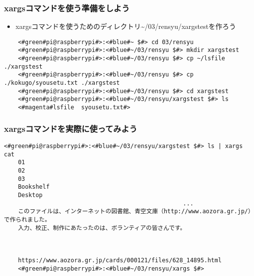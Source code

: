 \begin{frame}[fragile]
    \frametitle{xargsコマンドを使う準備をしよう}
    \begin{itemize}
        \item xargsコマンドを使うためのディレクトリ\textasciitilde/03/rensyu/xargstestを作ろう
    \end{itemize}
    \begin{lstlisting}
    <#green#pi@raspberrypi#>:<#blue#~ $#> cd 03/rensyu
    <#green#pi@raspberrypi#>:<#blue#~/03/rensyu $#> mkdir xargstest
    <#green#pi@raspberrypi#>:<#blue#~/03/rensyu $#> cp ~/lsfile ./xargstest
    <#green#pi@raspberrypi#>:<#blue#~/03/rensyu $#> cp ./kokugo/syousetu.txt ./xargstest
    <#green#pi@raspberrypi#>:<#blue#~/03/rensyu $#> cd xargstest
    <#green#pi@raspberrypi#>:<#blue#~/03/rensyu/xargstest $#> ls
    <#magenta#lsfile  syousetu.txt#>
    \end{lstlisting}
\end{frame}

\begin{frame}[fragile]
    \frametitle{xargsコマンドを実際に使ってみよう}
    \begin{lstlisting}[title=xargsコマンドを使ってcatコマンドを使う]
    <#green#pi@raspberrypi#>:<#blue#~/03/rensyu/xargstest $#> ls | xargs cat
    01
    02
    03
    Bookshelf
    Desktop
                                                   ...
    このファイルは、インターネットの図書館、青空文庫（http://www.aozora.gr.jp/）で作られました。
    入力、校正、制作にあたったのは、ボランティアの皆さんです。
        
        
        
    https://www.aozora.gr.jp/cards/000121/files/628_14895.html
    <#green#pi@raspberrypi#>:<#blue#~/03/rensyu/xargs $#>
    \end{lstlisting}
\end{frame}

